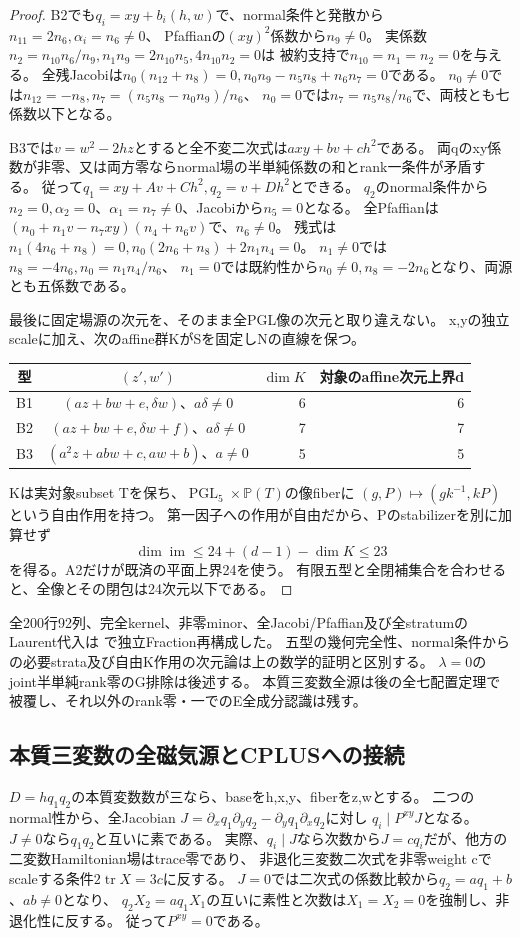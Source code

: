\documentclass[a4paper,11pt]{ltjsarticle}
\theoremstyle{definition}
\newcommand{\PGL}{\operatorname{PGL}}
\begin{document}
\begin{proof}
B2でも$q_i=xy+b_i(h,w)$で、normal条件と発散から$n_{11}=2n_6,\alpha_i=n_6\ne0$、
Pfaffianの$(xy)^2$係数から$n_9\ne0$。
実係数$n_2=n_{10}n_6/n_9,n_1n_9=2n_{10}n_5,4n_{10}n_2=0$は
被約支持で$n_{10}=n_1=n_2=0$を与える。
全残Jacobiは$n_0(n_{12}+n_8)=0,n_0n_9-n_5n_8+n_6n_7=0$である。
$n_0\ne0$では$n_{12}=-n_8,n_7=(n_5n_8-n_0n_9)/n_6$、
$n_0=0$では$n_7=n_5n_8/n_6$で、両枝とも七係数以下となる。

B3では$v=w^2-2hz$とすると全不変二次式は$axy+bv+ch^2$である。
両qのxy係数が非零、又は両方零ならnormal場の半単純係数の和とrank一条件が矛盾する。
従って$q_1=xy+Av+Ch^2,q_2=v+Dh^2$とできる。
$q_2$のnormal条件から$n_2=0,\alpha_2=0$、$\alpha_1=n_7\ne0$、Jacobiから$n_5=0$となる。
全Pfaffianは$(n_0+n_1v-n_7xy)(n_4+n_6v)$で、$n_6\ne0$。
残式は$n_1(4n_6+n_8)=0,n_0(2n_6+n_8)+2n_1n_4=0$。
$n_1\ne0$では$n_8=-4n_6,n_0=n_1n_4/n_6$、
$n_1=0$では既約性から$n_0\ne0,n_8=-2n_6$となり、両源とも五係数である。

最後に固定場源の次元を、そのまま全PGL像の次元と取り違えない。
x,yの独立scaleに加え、次のaffine群KがSを固定しNの直線を保つ。
\begin{center}\small
\begin{tabular}{c|c|r|r}
型&$(z',w')$&$\dim K$&対象のaffine次元上界d\\\hline
B1&$(az+bw+e,\delta w)$、$a\delta\ne0$&6&6\\
B2&$(az+bw+e,\delta w+f)$、$a\delta\ne0$&7&7\\
B3&$(a^2z+abw+c,aw+b)$、$a\ne0$&5&5
\end{tabular}
\end{center}
Kは実対象subset Tを保ち、$\PGL_5\times\mathbb P(T)$の像fiberに
$(g,P)\mapsto(gk^{-1},kP)$という自由作用を持つ。
第一因子への作用が自由だから、Pのstabilizerを別に加算せず
\[
 \dim\operatorname{im}\le24+(d-1)-\dim K\le23
\]
を得る。A2だけが既済の平面上界24を使う。
有限五型と全閉補集合を合わせると、全像とその閉包は24次元以下である。
\end{proof}
全200行92列、完全kernel、非零minor、全Jacobi/Pfaffian及び全stratumのLaurent代入は
で独立Fraction再構成した。
五型の幾何完全性、normal条件からの必要strata及び自由K作用の次元論は上の数学的証明と区別する。
$\lambda=0$のjoint半単純rank零のG排除は後述する。
本質三変数全源は後の全七配置定理で被覆し、それ以外のrank零・一でのE全成分認識は残す。

\subsection{本質三変数の全磁気源とCPLUSへの接続}
$D=hq_1q_2$の本質変数数が三なら、baseをh,x,y、fiberをz,wとする。
二つのnormal性から、全Jacobian
$J=\partial_xq_1\partial_yq_2-\partial_yq_1\partial_xq_2$に対し
$q_i\mid P^{xy}J$となる。
$J\ne0$なら$q_1q_2$と互いに素である。
実際、$q_i\mid J$なら次数から$J=cq_i$だが、他方の二変数Hamiltonian場はtrace零であり、
非退化三変数二次式を非零weight cでscaleする条件$2\operatorname{tr}X=3c$に反する。
$J=0$では二次式の係数比較から$q_2=aq_1+b$、$ab\ne0$となり、
$q_2X_2=aq_1X_1$の互いに素性と次数は$X_1=X_2=0$を強制し、非退化性に反する。
従って$P^{xy}=0$である。
\end{document}

